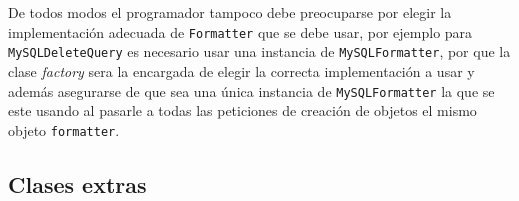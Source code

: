 De todos modos el programador tampoco debe preocuparse por elegir la implementación adecuada de \verb=Formatter= que se debe usar, por ejemplo para \verb=MySQLDeleteQuery= es necesario usar una instancia de \verb=MySQLFormatter=, por que la clase \textit{factory} sera la encargada de elegir la correcta implementación a usar y además asegurarse de que sea una única instancia de \verb=MySQLFormatter= la que se este usando al pasarle a todas las peticiones de creación de objetos el mismo objeto \verb=formatter=.  
%
\subsection{Clases extras}\label{sec:extras}

